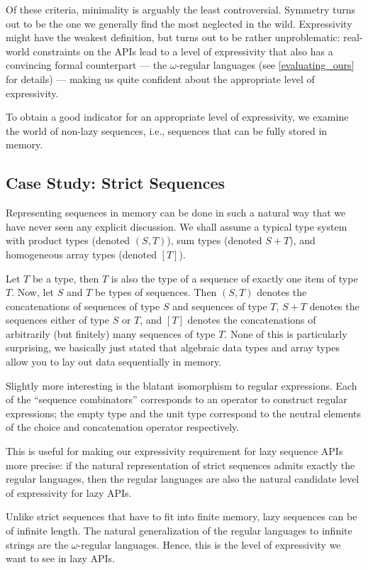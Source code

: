 \documentclass[sigplan,screen,10pt,review]{acmart}
\begin{document}
Of these criteria, minimality is arguably the least controversial. Symmetry turns out to be the one we generally find the most neglected in the wild. Expressivity might have the weakest definition, but turns out to be rather unproblematic: real-world constraints on the APIs lead to a level of expressivity that also has a convincing formal counterpart --- the $\omega$-regular languages (see \cref{evaluating_ours} for details) --- making us quite confident about the appropriate level of expressivity.

To obtain a good indicator for an appropriate level of expressivity, we examine the world of non-lazy sequences, i.e., sequences that can be fully stored in memory.

\subsection{Case Study: Strict Sequences}\label{strict_sequences}

Representing sequences in memory can be done in such a natural way that we have never seen any explicit discussion. We shall assume a typical type system with product types (denoted $(S, T)$), sum types (denoted $S + T$), and homogeneous array types (denoted $[T]$).

Let $T$ be a type, then $T$ is also the type of a sequence of exactly one item of type $T$. Now, let $S$ and $T$ be types of sequences. Then $(S, T)$ denotes the concatenations of sequences of type $S$ and sequences of type $T$, $S + T$ denotes the sequences either of type $S$ or $T$, and $[T]$ denotes the concatenations of arbitrarily (but finitely) many sequences of type $T$. None of this is particularly surprising, we basically just stated that algebraic data types and array types allow you to lay out data sequentially in memory.

Slightly more interesting is the blatant isomorphism to regular expressions. Each of the ``sequence combinators'' corresponds to an operator to construct regular expressions; the empty type and the unit type correspond to the neutral elements of the choice and concatenation operator respectively.

This is useful for making our expressivity requirement for lazy sequence APIs more precise: if the natural representation of strict sequences admits exactly the regular languages, then the regular languages are also the natural candidate level of expressivity for lazy APIs.

Unlike strict sequences that have to fit into finite memory, lazy sequences can be of infinite length. The natural generalization of the regular languages to infinite strings are the $\omega$-regular languages. Hence, this is the level of expressivity we want to see in lazy APIs.
\end{document}
